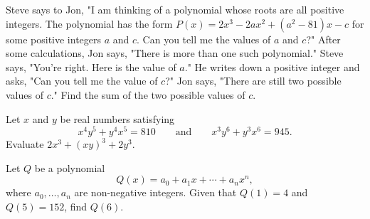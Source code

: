 \documentclass[11pt]{article}
\theoremstyle{definition}
\begin{document}
%	













\begin{question}[name={2015 AIME II, \href{https://artofproblemsolving.com/community/c4p4652179}{Problem 6}}]
	Steve says to Jon, "I am thinking of a polynomial whose roots are all positive integers. The polynomial has the form $P(x)=2x^3-2ax^2+(a^2-81)x-c$ for some positive integers $a$ and $c$. Can you tell me the values of $a$ and $c$?" After some calculations, Jon says, "There is more than one such polynomial." Steve says, "You’re right. Here is the value of $a$." He writes down a positive integer and asks, "Can you tell me the value of $c$?" Jon says, "There are still two possible values of $c$." Find the sum of the two possible values of $c$.
\end{question}


%	








\begin{question}[name={2015 AIME II, \href{https://artofproblemsolving.com/community/c4p4652236}{Problem 14}}]
	Let $x$ and $y$ be real numbers satisfying $$x^4y^5+y^4x^5=810 \qquad \text{and} \qquad x^3y^6+y^3x^6=945.$$ Evaluate $2x^3+(xy)^3+2y^3$.
\end{question}


%	



\begin{question}[name={2015 HMMT, Algebra, \href{https://artofproblemsolving.com/community/c129h1071065p4658474}{Problem 1}}]
	Let $Q$ be a polynomial\[Q(x)=a_0+a_1x+\cdots+a_nx^n,\]where $a_0,\ldots,a_n$ are non-negative integers. Given that $Q(1)=4$ and $Q(5)=152$, find $Q(6)$.
\end{question}




%	
\end{document}
